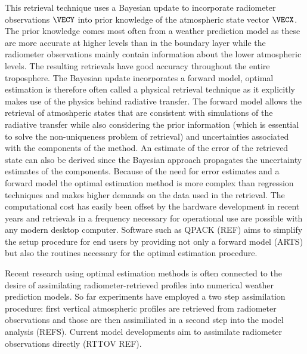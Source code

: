     This retrieval technique uses a Bayesian update to incorporate radiometer
    observations $\VECY$ into prior knowledge of the atmospheric state vector
    $\VECX$. The prior knowledge comes most often from a weather prediction
    model as these are more accurate at higher levels than in the boundary
    layer while the radiometer observations mainly contain information about
    the lower atmospheric levels. The resulting retrievals have good accuracy
    throughout the entire troposphere. The Bayesian update incorporates
    a forward model, optimal estimation is therefore often called a physical
    retrieval technique as it explicitly makes use of the physics behind
    radiative transfer. The forward model allows the retrieval of atmoshperic
    states that are consistent with simulations of the radiative transfer while
    also considering the prior information (which is essential to solve the
    non-uniqueness problem of retrieval) and uncertainties associated with
    the components of the method. An estimate of the error of the retrieved
    state can also be derived since the Bayesian approach propagates the
    uncertainty estimates of the components. Because of the need for error
    estimates and a forward model  the optimal estimation method is more
    complex than regression techniques and makes higher demands on the data
    used in the retrieval. The computational cost has easily been offset by
    the hardware development in recent years and retrievals in a frequency
    necessary for operational use are possible with any modern desktop
    computer. Software such as QPACK (REF) aims to simplify the setup
    procedure for end users by providing not only a forward model (ARTS) but
    also the routines necessary for the optimal estimation procedure.

    Recent research using optimal estimation methods is often connected to
    the desire of assimilating radiometer-retrieved profiles into numerical
    weather prediction models. So far experiments have employed a two step
    assimilation procedure: first vertical atmospheric profiles are retrieved
    from radiometer observations and those are then assimiliated in a second
    step into the model analysis (REFS). Current model developments aim to
    assimilate radiometer observations directly (RTTOV REF).

